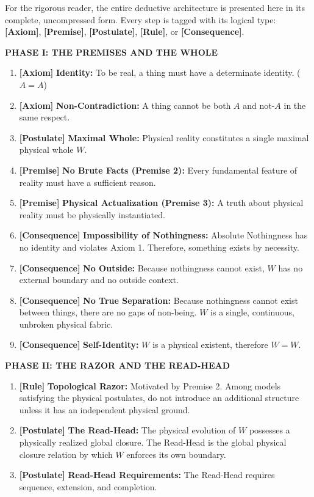 \documentclass[11pt]{article}
\theoremstyle{canonstyle}
\begin{document}
For the rigorous reader, the entire deductive architecture is presented here in its complete, uncompressed form. Every step is tagged with its logical type: \textbf{[Axiom]}, \textbf{[Premise]}, \textbf{[Postulate]}, \textbf{[Rule]}, or \textbf{[Consequence]}.

\textbf{PHASE I: THE PREMISES AND THE WHOLE}
\begin{enumerate}
    \item \textbf{[Axiom]} \textbf{Identity:} To be real, a thing must have a determinate identity. ($A=A$)
    \item \textbf{[Axiom]} \textbf{Non-Contradiction:} A thing cannot be both $A$ and not-$A$ in the same respect.
    \item \textbf{[Postulate]} \textbf{Maximal Whole:} Physical reality constitutes a single maximal physical whole $W$.
    \item \textbf{[Premise]} \textbf{No Brute Facts (Premise 2):} Every fundamental feature of reality must have a sufficient reason.
    \item \textbf{[Premise]} \textbf{Physical Actualization (Premise 3):} A truth about physical reality must be physically instantiated.
    \item \textbf{[Consequence]} \textbf{Impossibility of Nothingness:} Absolute Nothingness has no identity and violates Axiom 1. Therefore, something exists by necessity.
    \item \textbf{[Consequence]} \textbf{No Outside:} Because nothingness cannot exist, $W$ has no external boundary and no outside context.
    \item \textbf{[Consequence]} \textbf{No True Separation:} Because nothingness cannot exist between things, there are no gaps of non-being. $W$ is a single, continuous, unbroken physical fabric.
    \item \textbf{[Consequence]} \textbf{Self-Identity:} $W$ is a physical existent, therefore $W=W$.
\end{enumerate}

\textbf{PHASE II: THE RAZOR AND THE READ-HEAD}
\begin{enumerate}[resume]
    \item \textbf{[Rule]} \textbf{Topological Razor:} Motivated by Premise 2. Among models satisfying the physical postulates, do not introduce an additional structure unless it has an independent physical ground.
    \item \textbf{[Postulate]} \textbf{The Read-Head:} The physical evolution of $W$ possesses a physically realized global closure. The Read-Head is the global physical closure relation by which $W$ enforces its own boundary.
    \item \textbf{[Postulate]} \textbf{Read-Head Requirements:} The Read-Head requires sequence, extension, and completion.
\end{enumerate}
\end{document}
